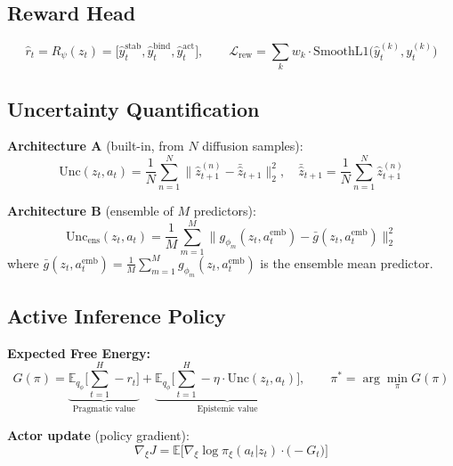\documentclass[12pt, a4paper]{article}
\begin{document}
\subsection{Reward Head}

\begin{equation}
    \hat{r}_t = R_\psi(z_t) = \big[\hat{y}^\text{stab}_t, \hat{y}^\text{bind}_t, \hat{y}^\text{act}_t\big], \qquad \mathcal{L}_\text{rew} = \sum_{k} w_k \cdot \text{SmoothL1}\big(\hat{y}^{(k)}_t, y^{(k)}_t\big)
\end{equation}

\subsection{Uncertainty Quantification}

\noindent \textbf{Architecture A} (built-in, from $N$ diffusion samples):
\begin{equation}
    \text{Unc}(z_t, a_t) = \frac{1}{N}\sum_{n=1}^N \|\hat{z}_{t+1}^{(n)} - \bar{\hat{z}}_{t+1}\|_2^2, \quad \bar{\hat{z}}_{t+1} = \frac{1}{N}\sum_{n=1}^N \hat{z}_{t+1}^{(n)}
\end{equation}

\noindent \textbf{Architecture B} (ensemble of $M$ predictors):
\begin{equation}
    \text{Unc}_\text{ens}(z_t, a_t) = \frac{1}{M}\sum_{m=1}^M \big\|g_{\phi_m}(z_t, a_t^\text{emb}) - \bar{g}(z_t, a_t^\text{emb})\big\|_2^2
\end{equation}
\noindent where $\bar{g}(z_t, a_t^\text{emb}) = \frac{1}{M}\sum_{m=1}^M g_{\phi_m}(z_t, a_t^\text{emb})$ is the ensemble mean predictor.

\subsection{Active Inference Policy}

\noindent \textbf{Expected Free Energy:}
\begin{equation}
    G(\pi) = \underbrace{\mathbb{E}_{q_\phi}\Big[\sum_{t=1}^{H} -r_t\Big]}_{\text{Pragmatic value}} + \underbrace{\mathbb{E}_{q_\phi}\Big[\sum_{t=1}^{H} -\eta \cdot \text{Unc}(z_t, a_t)\Big]}_{\text{Epistemic value}}, \qquad \pi^* = \arg\min_\pi G(\pi)
\end{equation}

\noindent \textbf{Actor update} (policy gradient):
\begin{equation}
    \nabla_\xi J = \mathbb{E}\Big[\nabla_\xi \log \pi_\xi(a_t | z_t) \cdot \big(-G_t\big)\Big]
\end{equation}
\end{document}
